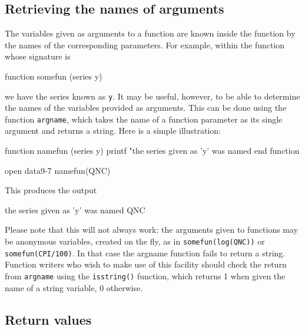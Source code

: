 \subsection{Retrieving the names of arguments}

The variables given as arguments to a function are known inside the
function by the names of the corresponding parameters.  For example,
within the function whose signature is
%
\begin{code}
function somefun (series y)
\end{code}
%
we have the series known as \texttt{y}.  It may be useful, however, to
be able to determine the names of the variables provided as arguments.
This can be done using the function \texttt{argname}, which takes the
name of a function parameter as its single argument and returns a
string.  Here is a simple illustration:
%
\begin{code}
function namefun (series y)
  printf "the series given as 'y' was named %
end function

open data9-7
namefun(QNC)
\end{code}
%
This produces the output
%
\begin{code}
the series given as 'y' was named QNC
\end{code}

Please note that this will not always work: the arguments given
to functions may be anonymous variables, created on the fly, as in
\texttt{somefun(log(QNC))} or \texttt{somefun(CPI/100)}.  In that case
the \textsf{argname} function fails to return a string.  Function
writers who wish to make use of this facility should check the return
from \texttt{argname} using the \texttt{isstring()} function, which
returns 1 when given the name of a string variable, 0 otherwise.


\subsection{Return values}

